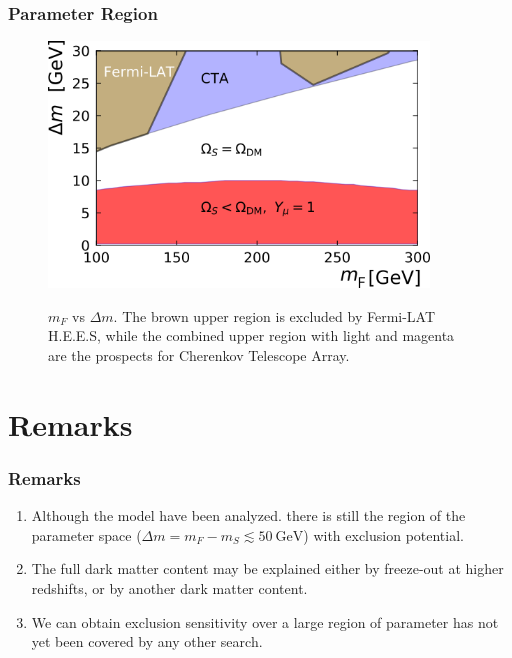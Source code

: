 \documentclass{beamer}
\numberwithin{figure}{section}
\begin{document}
\begin{frame}
\frametitle{Parameter Region}

\begin{figure}[!tbp]
	\centering
	\includegraphics[width=0.9\textwidth]{pictures/PS}\label{fig1}
	\caption{{\scriptsize $m_F$ vs $\Delta m$. The brown upper region is excluded by Fermi-LAT H.E.E.S, while the combined upper region with light and magenta are the prospects for Cherenkov Telescope Array. }}
	
\end{figure}


\end{frame}

\section{Remarks}
\begin{frame}
\frametitle{Remarks}

\begin{exampleblock}{}
	
	\begin{enumerate}

		\item Although the model have been analyzed. there is still the region of the parameter space ($\Delta m=m_{F}-m_S\lesssim 50\ \text{GeV}$) with exclusion potential.
		\item The full dark matter content may be explained either by freeze-out at higher redshifts, or by another dark matter content.
		\item  We can obtain exclusion sensitivity over a large region of parameter has not yet been covered by any other search.
	\end{enumerate}

\end{exampleblock}

\end{frame}




\ThankYouFrame

\end{document}
